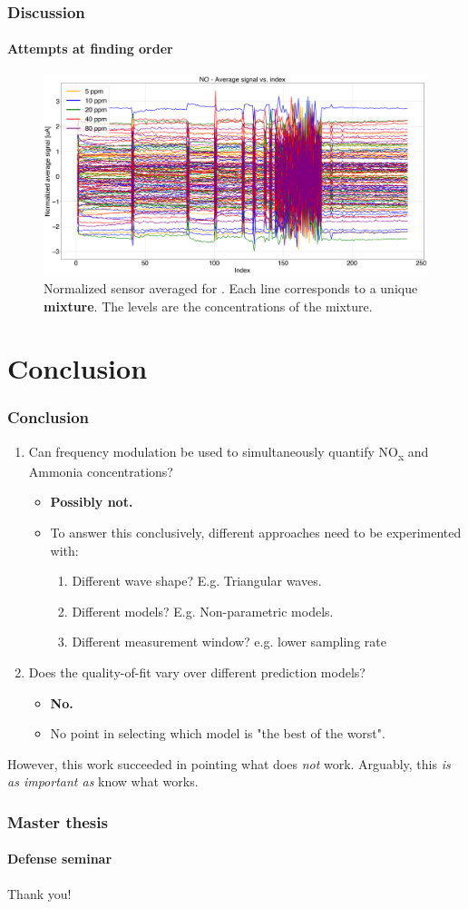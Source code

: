 \documentclass{beamer}
\newcommand{\nox}{\texorpdfstring{NO\textsubscript{x}}{NOx}\xspace}
\begin{document}
\begin{frame}
	\frametitle{Discussion}
	\framesubtitle{Attempts at finding order}
	\begin{figure}
	\includegraphics[width=1\linewidth]{../../figures/order2NO.png}
	\caption{Normalized sensor averaged for . Each line corresponds to a unique \textbf{mixture}. The levels are the  concentrations of the mixture.}
\end{figure}
\end{frame}

\section{Conclusion}
\begin{frame}
	\frametitle{Conclusion}
	
	\begin{enumerate}
		\item Can frequency modulation be used to simultaneously quantify \nox and Ammonia concentrations?
		\begin{itemize}
			\item \textbf{Possibly not.}
			\item To answer this conclusively, different approaches need to be experimented with:
			\begin{enumerate}
				\item Different wave shape? E.g. Triangular waves.
				\item Different models? E.g. Non-parametric models.
				\item Different measurement window? e.g. lower sampling rate				
				\end{enumerate}
			\end{itemize}
	
		
		\item Does the quality-of-fit vary over different prediction models?
		\begin{itemize}
			\item \textbf{No.}
			\item No point in selecting which model is "the best of the worst".
		\end{itemize}
	\end{enumerate}

However, this work succeeded in pointing what does \textit{not} work. Arguably, this \textit{is as important as} know what works.

\end{frame}

\begin{frame}
	\frametitle{Master thesis}
	\framesubtitle{Defense seminar}
	\centering
	\Huge Thank you!
\end{frame}
\end{document}

